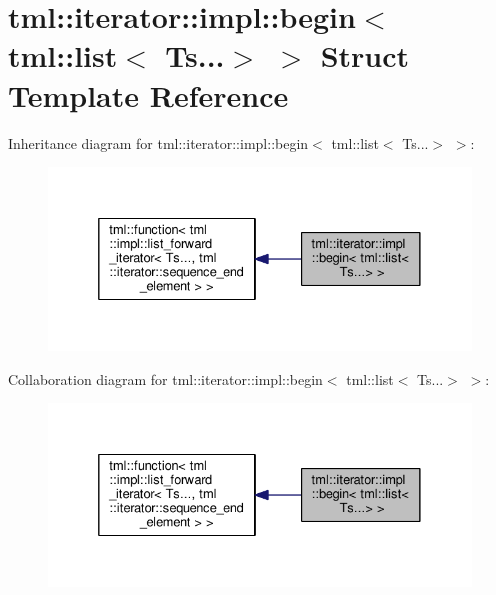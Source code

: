 \hypertarget{structtml_1_1iterator_1_1impl_1_1begin_3_01tml_1_1list_3_01_ts_8_8_8_4_01_4}{\section{tml\+:\+:iterator\+:\+:impl\+:\+:begin$<$ tml\+:\+:list$<$ Ts...$>$ $>$ Struct Template Reference}
\label{structtml_1_1iterator_1_1impl_1_1begin_3_01tml_1_1list_3_01_ts_8_8_8_4_01_4}
}


Inheritance diagram for tml\+:\+:iterator\+:\+:impl\+:\+:begin$<$ tml\+:\+:list$<$ Ts...$>$ $>$\+:
\nopagebreak
\begin{figure}[H]
\begin{center}
\leavevmode
\includegraphics[width=332pt]{structtml_1_1iterator_1_1impl_1_1begin_3_01tml_1_1list_3_01_ts_8_8_8_4_01_4__inherit__graph}
\end{center}
\end{figure}


Collaboration diagram for tml\+:\+:iterator\+:\+:impl\+:\+:begin$<$ tml\+:\+:list$<$ Ts...$>$ $>$\+:
\nopagebreak
\begin{figure}[H]
\begin{center}
\leavevmode
\includegraphics[width=332pt]{structtml_1_1iterator_1_1impl_1_1begin_3_01tml_1_1list_3_01_ts_8_8_8_4_01_4__coll__graph}
\end{center}
\end{figure}
